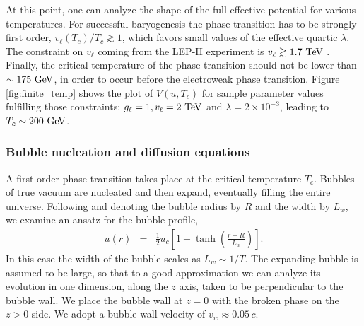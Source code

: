 \documentclass[prd,showpcs,amsmath,amssymb,nofootinbib,preprintnumbers,balancelastpage,longbibliography,superscriptaddress,notitlepage]{revtex4}
\def\bea{\begin{eqnarray}}
\def\eea{\end{eqnarray}}
\def\bea{\begin{eqnarray}}
\def\eea{\end{eqnarray}}
\begin{document}
At this point, one can analyze the shape of the full effective potential for various temperatures. For successful baryogenesis the phase transition has to be 
strongly first order, $v_\ell (T_c) / T_c \gtrsim 1$, which favors small values of the effective quartic $\lambda$.
The constraint on $v_\ell$ coming from the LEP-II experiment is $v_\ell \gtrsim 1.7 \ \rm TeV$ \cite{Schwaller:2013hqa}. 
Finally, the critical temperature of the phase transition should not be lower than $\sim 175 \ {\rm GeV}$, in order to occur before the electroweak phase transition. 
Figure \ref{fig:finite_temp} shows the plot of $V(u, T_c)$ for sample parameter values fulfilling those constraints: $ g_\ell = 1, v_\ell = 2 \ \rm TeV$ and 
$\lambda = 2\times 10^{-3}$, leading to $T_c \sim 200 \ {\rm GeV}$.




\subsubsection{Bubble nucleation and diffusion equations}
\label{de}

A first order phase transition takes place at the critical temperature $T_c$. Bubbles of true vacuum are nucleated and then expand, eventually filling the entire universe. Following \cite{Shu:2006mm} and denoting the bubble radius by $R$ and the width by $L_w$, we examine an ansatz for the bubble profile,
\bea
u(r) &=& \frac{1}{2} u_c \left[1-\tanh\left(\frac{r - R}{L_w}\right)\right].
\eea
In this case the width of the bubble scales as $L_w \sim 1/T$. The expanding bubble is assumed to be large, so that to a good approximation we can analyze its evolution in one dimension, along the $z$ axis, taken to be perpendicular to the bubble wall. We place the bubble wall at $z=0$ with the broken phase on the  $z>0$ side. 
We adopt a bubble wall velocity of $v_w \approx 0.05\, c$.   
\end{document}
